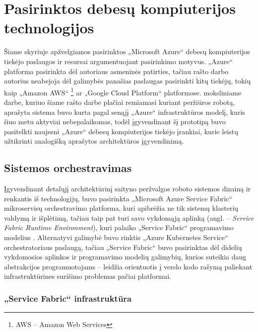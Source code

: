 \section{Pasirinktos debesų kompiuterijos technologijos}

Šiame skyriuje apžvelgiamos pasirinktos „Microsoft Azure“ debesų kompiuterijos tiekėjo paslaugos ir resursai argumentuojant pasirinkimo motyvus. „Azure“ platforma pasirinkta dėl autoriaus asmeninės patirties, tačiau rašto darbo autorius neabejoja dėl galimybės panašias paslaugas pasirinkti kitų tiekėjų, tokių kaip „Amazon AWS“ \footnote{AWS -- Amazon Web Services} ar „Google Cloud Platform“ platformose. \cite{MercedCloudBasedWebCrawler} moksliniame darbe, kuriuo šiame rašto darbe plačiai remiamasi kuriant peržiūros robotą, aprašyta sistema  buvo kurta pagal senąjį „Azure“ infrastruktūros modelį, kuris šiuo metu aktyviai nebepalaikomas, todėl įgyvendinant šį prototipą buvo pasitelkti naujesni „Azure“ debesų kompiuterijos tiekėjo įrankiai, kurie leistų užtikrinti analogišką aprašytos architektūros įgyvendinimą.

\subsection{Sistemos orchestravimas}

Įgyvendinant detalųjį architektūrinį saityno peržvalgos roboto sistemos dizainą ir renkantis iš technologijų, buvo pasirinkta „Microsoft Azure Service Fabric“ mikroservisų orchestravimo platforma, kuri apibrėžia ne tik sistemų klasterių valdymą ir išplėtimą, tačiau taip pat turi savo vykdomąją aplinką (angl. -- \textit{Service Fabric Runtime Environment}), kuri palaiko „Service Fabric“ programavimo modelius \cite{ServiceFabricTerminology}. Alternatyvi galimybė buvo rinktis „Azure Kubernetes Service“ orchestratoriaus paslaugą, tačiau „Service Fabric“ buvo pasirinktas dėl didelių vykdomosios aplinkos ir programavimo modelių galimybių, kurios suteikia daug abstrakcijos programuotojams -- leidžia orientuotis į verslo kodo rašymą paliekant infrastruktūrines surišimo problemas pačiai platformai.

\subsubsection{„Service Fabric“ infrastruktūra}

